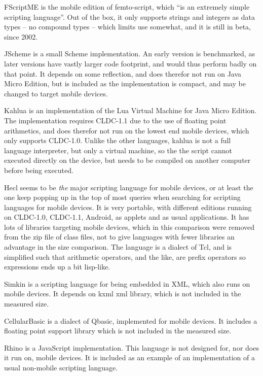 \documentclass[11pt]{report}
\begin{document}
FScriptME\cite{fscriptme} is the mobile edition of femto-script, which ``is an extremely simple scripting language''\cite{fscript}. 
Out of the box, it only supports strings and integers as data types -- no compound types -- which limits use somewhat, and it is still in beta, since 2002. 

JScheme\cite{jscheme} is a small Scheme implementation. An early version is benchmarked, as later versions have vastly larger code footprint, and would thus perform badly on that point. It depends on some reflection, and does therefor not run on Java Micro Edition, but is included as the implementation is compact, and may be changed to target mobile devices.

Kahlua\cite{kahlua} is an implementation of the Lua Virtual Machine for Java Micro Edition. 
The implementation requires CLDC-1.1 due to the use of floating point arithmetics, and does therefor not run on the lowest end mobile devices, which only supports CLDC-1.0.
Unlike the other languages, kahlua is not a full language interpreter, but only a virtual machine, so the the script cannot executed directly on the device, but needs to be compiled on another computer before being executed.

Hecl\cite{hecl} seems to be \emph{the} major scripting language for mobile devices, or at least the one keep popping up in the top of most queries when searching for scripting languages for mobile devices.
It is very portable, with different editions running on CLDC-1.0, CLDC-1.1, Android, as applets and as usual applications.
It has lots of libraries targeting mobile devices, which in this comparison were removed from the zip file of class files, not to give languages with fewer libraries an advantage in the size comparison.
The language is a dialect of Tcl, and is simplified such that arithmetic operators, and the like, are prefix operators so expressions ends up a bit lisp-like.

Simkin\cite{simkin} is a scripting language for being embedded in XML, which also runs on mobile devices. It depends on kxml xml library, which is not included in the measured size. 

CellularBasic\cite{cellularbasic} is a dialect of Qbasic, implemented for mobile devices. 
It includes a floating point support library which is not included in the measured size. 

Rhino\cite{rhino} is a JavaScript implementation. This language is not designed for, nor does it run on, mobile devices. It is included as an example of an implementation of a usual non-mobile scripting language.
\end{document}
